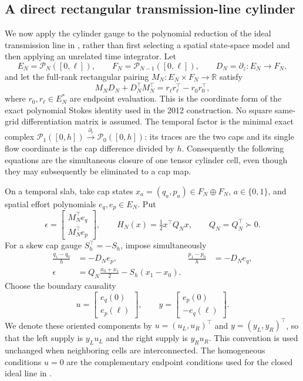 \documentclass[11pt,a4paper]{article}
\newcommand{\R}{\mathbb R}
\newcommand{\cP}{\mathcal P}
\begin{document}
\subsection{A direct rectangular transmission-line cylinder}

We now apply the cylinder gauge to the polynomial reduction of the ideal
transmission line in \cite{moulla2012}, rather than first selecting a
spatial state-space model and then applying an unrelated time integrator.
Let
\[
 E_N=\cP_N([0,\ell]),\qquad F_N=\cP_{N-1}([0,\ell]),
 \qquad D_N=\partial_z:E_N\longrightarrow F_N,
\]
and let the full-rank rectangular pairing \(M_N:E_N\times F_N\to\R\)
satisfy
\begin{equation}\label{eq:rectangular-stokes-line}
 M_ND_N+D_N^\top M_N^\top
 =r_\ell r_\ell^\top-r_0r_0^\top,
\end{equation}
where \(r_0,r_\ell\in E_N^*\) are endpoint evaluation.  This is the
coordinate form of the exact polynomial Stokes identity used in the 2012
construction.  No square same-grid differentiation matrix is assumed.
The temporal factor is the minimal exact complex
\(\cP_1([0,h])\xrightarrow{\partial_t}\cP_0([0,h])\): its traces are the
two caps and its single flow coordinate is the cap difference divided by
\(h\).  Consequently the following equations are the simultaneous
closure of one tensor cylinder cell, even though they may subsequently be
eliminated to a cap map.

On a temporal slab, take cap states \(x_a=(q_a,p_a)\in F_N\oplus F_N\),
\(a\in\{0,1\}\), and spatial effort polynomials
\(e_q,e_p\in E_N\).  Put
\begin{equation}\label{eq:active-line-efforts}
 \epsilon=
 \begin{bmatrix}M_N^\top e_q\\M_N^\top e_p\end{bmatrix},
 \qquad
 H_N(x)=\tfrac12x^\top Q_Nx,
 \qquad Q_N=Q_N^\top\succ0.
\end{equation}
For a skew cap gauge \(S_h^\top=-S_h\), impose simultaneously
\begin{align}
 \frac{q_1-q_0}{h}&=-D_Ne_p,
 &\frac{p_1-p_0}{h}&=-D_Ne_q,
 \label{eq:rectangular-line-flow}\\
 \epsilon&=Q_N\frac{x_0+x_1}{2}-S_h(x_1-x_0).
 \label{eq:rectangular-line-closure}
\end{align}
Choose the boundary causality
\begin{equation}\label{eq:line-port-causality}
 u=\begin{bmatrix}e_q(0)\\e_p(\ell)\end{bmatrix},
 \qquad
 y=\begin{bmatrix}e_p(0)\\-e_q(\ell)\end{bmatrix}.
\end{equation}
We denote these oriented components by
\(u=(u_L,u_R)^\top\) and \(y=(y_L,y_R)^\top\), so that the left supply is
\(y_Lu_L\) and the right supply is \(y_Ru_R\).  This convention is used
unchanged when neighboring cells are interconnected.
The homogeneous conditions \(u=0\) are the complementary endpoint
conditions used for the closed ideal line in \cite{moulla2012}.
\end{document}
